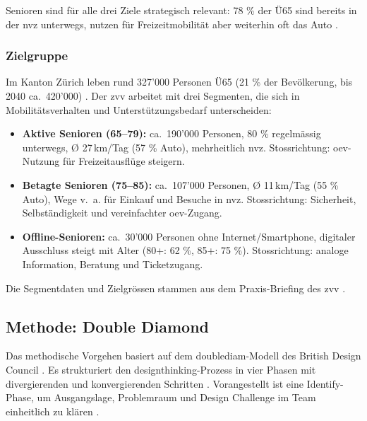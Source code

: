 Senioren sind für alle drei Ziele strategisch relevant: 78 \% der Ü65 sind bereits in der \gls{nvz} unterwegs, nutzen für Freizeitmobilität aber weiterhin oft das Auto \parencite{zvvbriefing2026}.

\subsubsection{Zielgruppe}
Im Kanton Zürich leben rund 327'000 Personen Ü65 (21 \% der Bevölkerung, bis 2040 ca.\ 420'000) \parencite{zvvbriefing2026}.
Der \gls{zvv} arbeitet mit drei Segmenten, die sich in Mobilitätsverhalten und Unterstützungsbedarf unterscheiden:

\begin{itemize}
  \item \textbf{Aktive Senioren (65--79):} ca.\ 190'000 Personen, 80 \% regelmässig unterwegs, Ø 27\,km/Tag (57 \% Auto), mehrheitlich \gls{nvz}. Stossrichtung: \gls{oev}-Nutzung für Freizeitausflüge steigern.
  \item \textbf{Betagte Senioren (75--85):} ca.\ 107'000 Personen, Ø 11\,km/Tag (55 \% Auto), Wege v.~a. für Einkauf und Besuche in \gls{nvz}. Stossrichtung: Sicherheit, Selbständigkeit und vereinfachter \gls{oev}-Zugang.
  \item \textbf{Offline-Senioren:} ca.\ 30'000 Personen ohne Internet/Smartphone, digitaler Ausschluss steigt mit Alter (80+: 62 \%, 85+: 75 \%). Stossrichtung: analoge Information, Beratung und Ticketzugang.
\end{itemize}

Die Segmentdaten und Zielgrössen stammen aus dem Praxis-Briefing des \gls{zvv} \parencite{zvvbriefing2026}.

\subsection{Methode: Double Diamond}
Das methodische Vorgehen basiert auf dem \gls{doublediam}-Modell des British Design Council \parencite{designcouncil2005}. Es strukturiert den \gls{designthinking}-Prozess in vier Phasen mit divergierenden und konvergierenden Schritten \parencite{graf2024}.
Vorangestellt ist eine Identify-Phase, um Ausgangslage, Problemraum und Design Challenge im Team einheitlich zu klären \parencite{graf2024}.

\begin{center}
  
  \captionsetup{type=figure,justification=centering}
\end{center}

